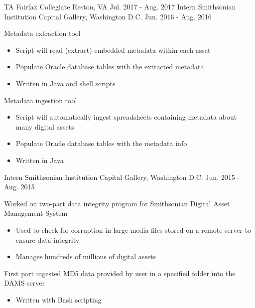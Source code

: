 \begin{cventries}
    \cventry
    {TA}
    {Fairfax Collegiate}
    {Reston, VA}
    {Jul. 2017 - Aug. 2017}
    {}
    \cventry
    {Intern}
    {Smithsonian Institution}
    {Capital Gallery, Washington D.C.}
    {Jun. 2016 - Aug. 2016}
    {
        \begin{cvitems}
        \item{Metadata extraction tool}
        \begin{itemize}
            \item{Script will read (extract) embedded metadata within each asset}
            \item{Populate Oracle database tables with the extracted metadata}
            \item{Written in Java and shell scripts}
        \end{itemize}
        \item{Metadata ingestion tool}
        \begin{itemize}
            \item{Script will automatically ingest spreadsheets containing metadata about many digital assets}
            \item{Populate Oracle database tables with the metadata info}
            \item{Written in Java}
        \end{itemize}
        \end{cvitems}
    }
    \cventry
    {Intern}
    {Smithsonian Institution}
    {Capital Gallery, Washington D.C.}
    {Jun. 2015 - Aug. 2015}
    {
      \begin{cvitems}
        \item {Worked on two-part data integrity program for Smithsonian Digital Asset Management System}
        \begin{itemize}
            \item{Used to check for corruption in large media files stored on a remote server to ensure data integrity}
            \item{Manages hundreds of millions of digital assets}
        \end{itemize}
        \item {First part ingested MD5 data provided by user in a specified folder into the DAMS server}
        \begin{itemize}
            \item{Written with Bash scripting}
        \end{itemize}

\end{cvitems}}
\end{cventries}
